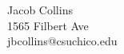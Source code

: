 \documentclass[twocolumn]{cinc}
\begin{document}
  
  
      


\begin{correspondence}
Jacob Collins\\
1565 Filbert Ave\\
jbcollins@csuchico.edu
\end{correspondence}

\balance
\end{document}
